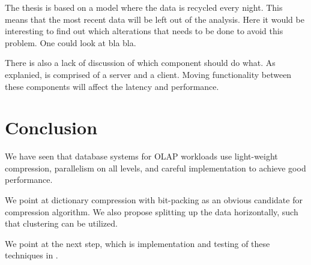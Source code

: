 The thesis is based on a model where the data is recycled every night. This means that the most recent data will be left out of the analysis. Here it would be interesting to find out which alterations that needs to be done to avoid this problem. One could look at bla bla.

There is also a lack of discussion of which component should do what. As explanied, \genusSoftware is comprised of a server and a client. Moving functionality between these components will affect the latency and performance.


\section{Conclusion}
\label{sec:Conclusion}
We have seen that database systems for OLAP workloads use light-weight compression, parallelism on all levels, and careful implementation to achieve good performance.

We point at dictionary compression with bit-packing as an obvious candidate for compression algorithm. We also propose splitting up the data horizontally, such that clustering can be utilized.

We point at the next step, which is implementation and testing of these techniques in \genusSoftware.

